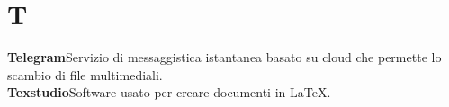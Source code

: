 \newpage
\section{T}\label{l:T}

\textbf{Telegram}\newline Servizio di messaggistica istantanea basato su cloud che permette lo scambio di file multimediali.\\
\newline
\textbf{Texstudio}\newline Software usato per creare documenti in \LaTeX.